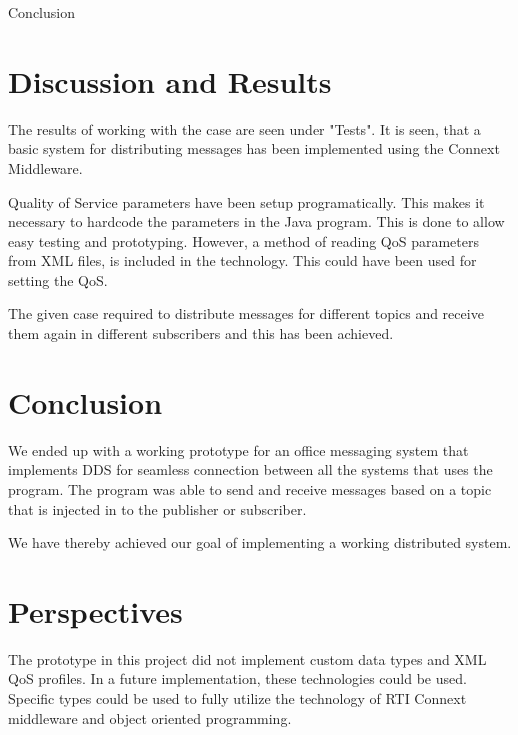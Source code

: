 {Conclusion}
\section{Discussion and Results}
The results of working with the case are seen under "Tests". It is seen, that a basic system for distributing messages has been implemented using the Connext Middleware. 

Quality of Service parameters have been setup programatically. This makes it necessary to hardcode the parameters in the Java program. This is done to allow easy testing and prototyping. However, a method of reading QoS parameters from XML files, is included in the technology. This could have been used for setting the QoS.

The given case required to distribute messages for different topics and receive them again in different subscribers and this has been achieved.

\section{Conclusion}
We ended up with a working prototype for an office messaging system that implements DDS for seamless connection between all the systems that uses the program.
The program was able to send and receive messages based on a topic that is injected in to the publisher or subscriber.

We have thereby achieved our goal of implementing a working distributed system.

\section{Perspectives}
The prototype in this project did not implement custom data types and XML QoS profiles. In a future implementation, these technologies could be used. Specific types could be used to fully utilize the technology of RTI Connext middleware and object oriented programming. 
